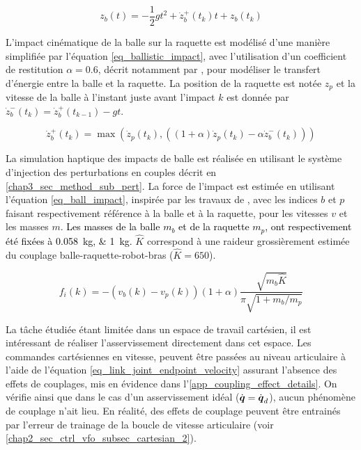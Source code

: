 \begin{equation} \label{eq_ballistic}
	z_b(t) = -\frac{1}{2}gt^2+\dot{z}_b^+(t_k) t+z_b(t_k)
\end{equation}

L'impact cinématique de la balle sur la raquette est modélisé d'une manière simplifiée par l'équation \cref{eq_ballistic_impact}, avec l'utilisation d'un coefficient de restitution $ \alpha=0.6 $, décrit notamment par \textcite{avrin_self-organization_2018}, pour modéliser le transfert d'énergie entre la balle et la raquette. La position de la raquette est notée $ z_p $ et la vitesse de la balle à l'instant juste avant l'impact $ k $ est donnée par $ \dot{z}_b^-(t_k) = \dot{z}_b^+(t_{k-1})-gt $.

\begin{equation} \label{eq_ballistic_impact}
	\dot{z}_b^+(t_k) = \max\left(\dot{z}_p(t_k), \left((1+\alpha)\dot{z}_p(t_k)-\alpha\dot{z}_b^-(t_k)\right)\right)
\end{equation}

La simulation haptique des impacts de balle est réalisée en utilisant le système d'injection des perturbations en couples décrit en \cref{chap3_sec_method_sub_pert}. La force de l'impact est estimée en utilisant l'équation \cref{eq_ball_impact}, inspirée par les travaux de \textcite{kawazoe_dynamics_2002}, avec les indices $b$ et $p$ faisant respectivement référence à la balle et à la raquette, pour les vitesses $v$ et les masses $m$. \textcolor{black}{Les masses de la balle $m_b$ et de la raquette $m_p$, ont respectivement été fixées à \SIlist{0.058;1}{\kilogram}.} $\hat{K}$ correspond à une raideur grossièrement estimée du couplage balle-raquette-robot-bras ($\hat{K}=650$).

\begin{equation} \label{eq_ball_impact}
	f_i(k) = -(v_b(k) - v_p(k)) (1 + \alpha) \frac{\sqrt{m_b \hat{K}}}{\pi \sqrt{1 + m_b/m_p}}
\end{equation}

La tâche étudiée étant limitée dans un espace de travail cartésien, il est intéressant de réaliser l'asservissement directement dans cet espace. Les commandes cartésiennes en vitesse, peuvent être passées au niveau articulaire à l'aide de l'équation \cref{eq_link_joint_endpoint_velocity} \parencite{khalil_modeling_2002} assurant l'absence des effets de couplages, mis en évidence dans l'\cref{app_coupling_effect_details}. On vérifie ainsi que dans le cas d'un asservissement idéal ($\dot{\vect{q}}=\dot{\vect{q}}_d$), aucun phénomène de couplage n'ait lieu. En réalité, des effets de couplage peuvent être entrainés par l'erreur de trainage de la boucle de vitesse articulaire (voir \cref{chap2_sec_ctrl_vfo_subsec_cartesian_2}).


